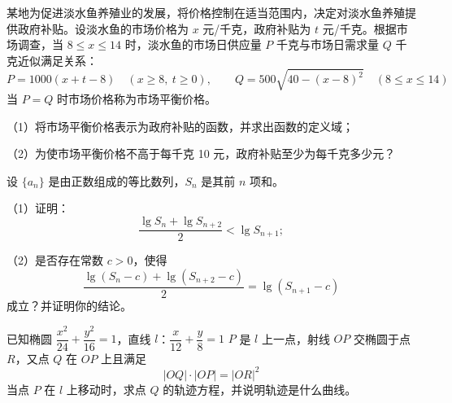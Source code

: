 \begin{question}
某地为促进淡水鱼养殖业的发展，将价格控制在适当范围内，决定对淡水鱼养殖提供政府补贴。设淡水鱼的市场价格为 $x$ 元/千克，政府补贴为 $t$ 元/千克。根据市场调查，当 $8\le x\le14$ 时，淡水鱼的市场日供应量 $P$ 千克与市场日需求量 $Q$ 千克近似满足关系：
\nopagebreak[4]
\[
P=1000(x+t-8)\quad(x\ge8,\ t\ge0),\qquad
Q=500\sqrt{40-(x-8)^2}\quad(8\le x\le14)
\]
当 $P=Q$ 时市场价格称为市场平衡价格。

（1）将市场平衡价格表示为政府补贴的函数，并求出函数的定义域；

（2）为使市场平衡价格不高于每千克 10 元，政府补贴至少为每千克多少元？

\end{question}
\begin{question}
设 $\{a_n\}$ 是由正数组成的等比数列，$S_n$ 是其前 $n$ 项和。

（1）证明：
\nopagebreak[4]
\[
\frac{\lg S_n+\lg S_{n+2}}{2}<\lg S_{n+1};
\]

（2）是否存在常数 $c>0$，使得
\nopagebreak[4]
\[
\frac{\lg(S_n-c)+\lg(S_{n+2}-c)}{2}=\lg(S_{n+1}-c)
\]
成立？并证明你的结论。

\end{question}
\begin{question}
已知椭圆 $\dfrac{x^2}{24}+\dfrac{y^2}{16}=1$，直线 $l$：$\dfrac{x}{12}+\dfrac{y}{8}=1$
$P$ 是 $l$ 上一点，射线 $OP$ 交椭圆于点 $R$，又点 $Q$ 在 $OP$ 上且满足
\nopagebreak[4]
\[
|OQ|\cdot|OP|=|OR|^2
\]
当点 $P$ 在 $l$ 上移动时，求点 $Q$ 的轨迹方程，并说明轨迹是什么曲线。

\end{question}